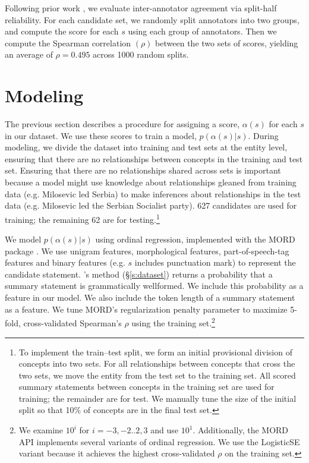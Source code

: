\documentclass[11pt,a4paper]{article}
\begin{document}
Following prior work \cite{Kiritchenko2017BestWorstSM}, we evaluate inter-annotator agreement via split-half reliability. For each candidate set, we randomly split annotators into two groups, and compute the score for each $s$ using each group of annotators. Then we compute the Spearman correlation $(\rho)$ between the two sets of scores, yielding an average of $\rho=0.495$ across 1000 random splits. 

\section{Modeling}\label{s:model}

The previous section describes a procedure for assigning a score, $\alpha(s)$ for each $s$ in our dataset. We use these scores to train a model, $p(\alpha(s) | s)$. During modeling, we divide the  dataset into training and test sets at the entity level, ensuring that there are no relationships between concepts in the training and test set. Ensuring that there are no relationships shared across sets is important because a model might use knowledge about relationships gleaned from training data (e.g. Milosevic led Serbia) to make inferences about relationships in the test data (e.g. Milosevic led the Serbian Socialist party). 627 candidates are used for training; the remaining 62 are for testing.\footnote{To implement the train--test split, we form an initial provisional division of concepts into two sets. For all relationships between concepts that cross the two sets, we move the entity from the test set to the training set. All scored summary statements between concepts in the training set are used for training; the remainder are for test. We manually tune the size of the initial split so that 10\% of concepts are in the final test set.} 

We model $p(\alpha(s) | s)$ using ordinal regression, implemented with the MORD package \cite{pedregosaizquierdo:tel-01100921}. We use unigram features, morphological features, part-of-speech-tag features and binary features (e.g. $s$ includes punctuation mark) to represent the candidate statement. \citet{N18-1159}'s method (\S\ref{s:dataset}) returns a probability that a summary statement is grammatically wellformed. We include this probability as a feature in our model. We also include the token length of a summary statement as a feature. We tune MORD's regularization penalty parameter to maximize 5-fold, cross-validated Spearman's $\rho$ using the training set.\footnote{We examine $10^{i}$ for $i=-3,-2..2,3$ and use $10^1$. Additionally, the MORD API implements several variants of ordinal regression. We use the LogisticSE variant because it achieves the highest cross-validated $\rho$ on the training set.}
 
\end{document}

